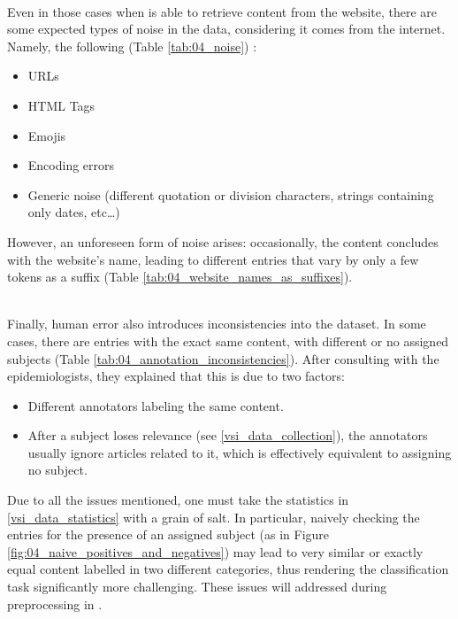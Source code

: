 




\label{vsi_issues_data_noise}
\ \\

Even in those cases when \trafilatura{} is able to retrieve content from the website, there are some expected types of noise in the data, considering it comes from the internet.
Namely, the following  (Table \ref{tab:04_noise}) :
\begin{itemize}
    \item URLs
    \item HTML Tags
    \item Emojis
    \item Encoding errors
    \item Generic noise (different quotation or division characters, strings containing only dates, etc\ldots)
\end{itemize}








However, an unforeseen form of noise arises: occasionally, the content concludes with the website's name, leading to different entries that vary by only a few tokens as a suffix (Table \ref{tab:04_website_names_as_suffixes}).




\label{vsi_issues_annotation_inconsistencies}
\ \\

Finally, human error also introduces inconsistencies into the \VSI{} dataset. In some cases, there are entries with the exact same content, with different or no assigned subjects (Table \ref{tab:04_annotation_inconsistencies}). After consulting with the epidemiologists, they explained that this is due to two factors:

\begin{itemize}
    \item Different annotators labeling the same content.
    \item After a subject loses relevance (see \headerName{} \ref{vsi_data_collection}), the annotators usually ignore articles related to it, which is effectively equivalent to assigning no subject.
\end{itemize}




Due to all the issues mentioned, one must take the statistics in \headerName{} \ref{vsi_data_statistics} with a grain of salt. In particular, naively checking the entries for the presence of an assigned subject (as in Figure \ref{fig:04_naive_positives_and_negatives}) may lead to very similar or exactly equal content labelled in two different categories, thus rendering the classification task significantly more challenging. These issues will addressed during preprocessing in \headerName{} .

\clearpage